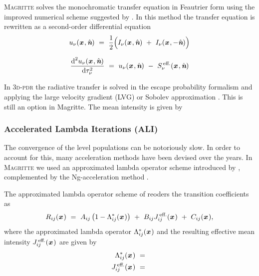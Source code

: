 \documentclass[a4paper,fleqn,usenatbib]{mnras}
\newcommand{\D}{\text{d}}
\newcommand{\x}{{\textit{\textbf{x}}}\,}
\newcommand{\n}{\hat{\textit{\textbf{n}}}}
\begin{document}
\textsc{Magritte} solves the monochromatic transfer equation in Feautrier form \citep{Feautrier1964} using the improved numerical scheme suggested by \citet{Rybicki1991}. In this method the transfer equation is rewritten as a second-order differential equation
\begin{equation}
	u_{\nu}(\x, \n) \ = \ \frac{1}{2}\Big( I_{\nu}(\x, \n) \ + \ I_{\nu}(\x, -\n) \Big)
\end{equation}

\begin{equation}
	\frac{\D^{2}u_{\nu}(\x, \n)}{\D\tau_{\nu}^{2}} \ = \ u_{\nu}(\x, \n) \ - \ S_{\nu}^{\,\text{eff.}}(\x, \n)
\end{equation}



In \textsc{3d-pdr} the radiative transfer is solved in the escape probability formalism and applying the large velocity gradient (LVG) or Sobolev approximation \citep{Sobolev1960, Castor1970, deJong1975, Poelman2005}. This is still an option in Magritte. The mean intensity is given by








\subsubsection{Accelerated Lambda Iterations (ALI)}

The convergence of the level populations can be notoriously slow. In order to account for this, many acceleration methods have been devised over the years. In \textsc{Magritte} we used an approximated lambda operator scheme introduced by \citet{Rybicki1991}, complemented by the Ng-acceleration method \citep{Ng1974}.

The approximated lambda operator scheme of \citeauthor{Rybicki1991} reoders the transition coefficients as
\begin{equation}
	R_{ij}(\x) \ = \ A_{ij} \left(1-\Lambda^{\ast}_{ij}(\x)\right) \ + \ B_{ij}  J^{\,\text{eff.}}_{ij}(\x) \ + \ C_{ij}(\x),
\label{RybickiHummer}
\end{equation}
where the approximated lambda operator $\Lambda^{\ast}_{ij}(\x)$ and the resulting effective mean intensity $J^{\,\text{eff.}}_{ij}(\x)$ are given by
\begin{equation}
\begin{split}
	\Lambda^{\ast}_{ij}(\x)    \ &= \ \\
	J^{\,\text{eff.}}_{ij}(\x) \ &= \ \\
\end{split}
\end{equation}
\end{document}
